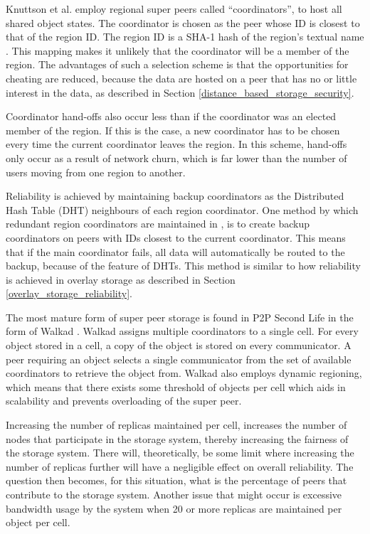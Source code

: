 Knuttson et al. \cite{knutsson_p2p_first} employ regional super peers called ``coordinators'', to host all shared object states. The coordinator is chosen as the peer whose ID is closest to that of the region ID. The region ID is a SHA-1 hash of the region's textual name \cite{SHA}. This mapping makes it unlikely that the coordinator will be a member of the region. The advantages of such a selection scheme is that the opportunities for cheating are reduced, because the data are hosted on a peer that has no or little interest in the data, as described in Section
\ref{distance_based_storage_security}.

Coordinator hand-offs also occur less than if the coordinator was an elected member of the region. If this is the case, a new coordinator has to be chosen every time the current coordinator leaves the region. In this scheme, hand-offs only occur as a result of network churn, which is far lower than the number of users moving from one region to another.

Reliability is achieved by maintaining backup coordinators as the Distributed Hash Table (DHT) neighbours of each region coordinator. One method by which redundant region coordinators are maintained in \cite{knutsson_p2p_first}, is to create backup coordinators on peers with IDs closest to the current coordinator. This means that if the main coordinator fails, all data will automatically be routed to the backup, because of the feature of DHTs. This method is similar to how reliability is achieved in overlay storage as described in Section \ref{overlay_storage_reliability}.

The most mature form of super peer storage is found in P2P Second Life \cite{varvello_phd} in the form of Walkad \cite{Walkad_Varvello}. Walkad assigns multiple coordinators to a single cell. For every object stored in a cell, a copy of the object is stored on every communicator. A peer requiring an object selects a single communicator from the set of available coordinators to retrieve the object from. Walkad also employs dynamic regioning, which means that there exists some threshold of objects per cell which aids in scalability and prevents overloading of the super peer.

Increasing the number of replicas maintained per cell, increases the number of nodes that participate in the storage system, thereby increasing the fairness of the storage system. There will, theoretically, be some limit where increasing the number of replicas further will have a negligible effect on overall reliability. The question then becomes, for this situation, what is the percentage of peers that contribute to the storage system. Another issue that might occur is excessive bandwidth usage by the system when 20 or more replicas are maintained per object per cell.

